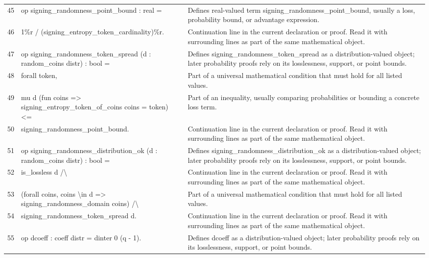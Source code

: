 \documentclass[10pt]{article}
\begin{document}
\begin{longtable}{r L{0.53\textwidth} L{0.37\textwidth}}
45 & {\ttfamily\scriptsize op signing\_randomness\_point\_bound : real =} & Defines real-valued term signing\_randomness\_point\_bound, usually a loss, probability bound, or advantage expression. \\
46 & {\ttfamily\scriptsize   1\%r / (signing\_entropy\_token\_cardinality)\%r.} & Continuation line in the current declaration or proof.  Read it with surrounding lines as part of the same mathematical object. \\
47 & {\ttfamily\scriptsize op signing\_randomness\_token\_spread (d : random\_coins distr) : bool =} & Defines signing\_randomness\_token\_spread as a distribution-valued object; later probability proofs rely on its losslessness, support, or point bounds. \\
48 & {\ttfamily\scriptsize   forall token,} & Part of a universal mathematical condition that must hold for all listed values. \\
49 & {\ttfamily\scriptsize     mu d (fun coins => signing\_entropy\_token\_of\_coins coins = token) <=} & Part of an inequality, usually comparing probabilities or bounding a concrete loss term. \\
50 & {\ttfamily\scriptsize     signing\_randomness\_point\_bound.} & Continuation line in the current declaration or proof.  Read it with surrounding lines as part of the same mathematical object. \\
51 & {\ttfamily\scriptsize op signing\_randomness\_distribution\_ok (d : random\_coins distr) : bool =} & Defines signing\_randomness\_distribution\_ok as a distribution-valued object; later probability proofs rely on its losslessness, support, or point bounds. \\
52 & {\ttfamily\scriptsize   is\_lossless d /\textbackslash{}} & Continuation line in the current declaration or proof.  Read it with surrounding lines as part of the same mathematical object. \\
53 & {\ttfamily\scriptsize   (forall coins, coins \textbackslash{}in d => signing\_randomness\_domain coins) /\textbackslash{}} & Part of a universal mathematical condition that must hold for all listed values. \\
54 & {\ttfamily\scriptsize   signing\_randomness\_token\_spread d.} & Continuation line in the current declaration or proof.  Read it with surrounding lines as part of the same mathematical object. \\
55 & {\ttfamily\scriptsize op dcoeff : coeff distr = dinter 0 (q - 1).} & Defines dcoeff as a distribution-valued object; later probability proofs rely on its losslessness, support, or point bounds. \\

\end{longtable}
\end{document}
